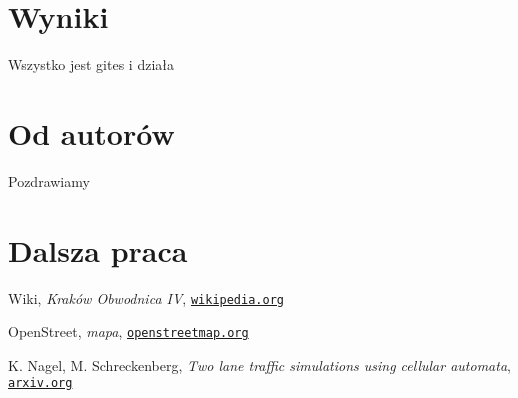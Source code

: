 \documentclass[a4paper,12pt]{article}
\begin{document}
    \section{Wyniki}
		Wszystko jest gites i działa
    \section{Od autorów}
    Pozdrawiamy

    \section{Dalsza praca}

	\pagebreak
	\begin{thebibliography}{15}
		Wiki, \textit{Kraków Obwodnica IV},
		\texttt{\href{https://pl.wikipedia.org/wiki/Obwodnice_Krakowa\#IV_obwodnica}{wikipedia.org}}
		
		OpenStreet, \textit{mapa},
		\texttt{\href{https://www.openstreetmap.org/}{openstreetmap.org}}
		
		K. Nagel, M. Schreckenberg, \textit{Two lane traffic simulations using cellular automata},
		\texttt{\href{https://arxiv.org/pdf/cond-mat/9512119.pdf}{arxiv.org}}
	\end{thebibliography}
	
\end{document}
